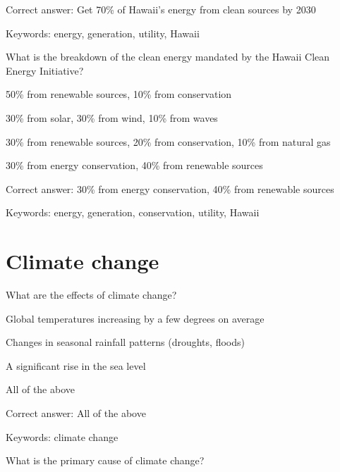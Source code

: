 Correct answer: Get 70\% of Hawaii's energy from clean sources by 2030

Keywords: energy, generation, utility, Hawaii

\begin{question}
	\item What is the breakdown of the clean energy mandated by the Hawaii Clean Energy Initiative?
\end{question}

\begin{answer}
	\item 50\% from renewable sources, 10\% from conservation
	\item 30\% from solar, 30\% from wind, 10\% from waves
	\item 30\% from renewable sources, 20\% from conservation, 10\% from natural gas
	\item 30\% from energy conservation, 40\% from renewable sources
\end{answer}

Correct answer: 30\% from energy conservation, 40\% from renewable sources

Keywords: energy, generation, conservation, utility, Hawaii

\section{Climate change}

\begin{question}
	\item What are the effects of climate change?
\end{question}

\begin{answer}
	\item Global temperatures increasing by a few degrees on average
	\item Changes in seasonal rainfall patterns (droughts, floods)
	\item A significant rise in the sea level
	\item All of the above
\end{answer}

Correct answer: All of the above

Keywords: climate change

\begin{question}
	\item What is the primary cause of climate change?
\end{question}

